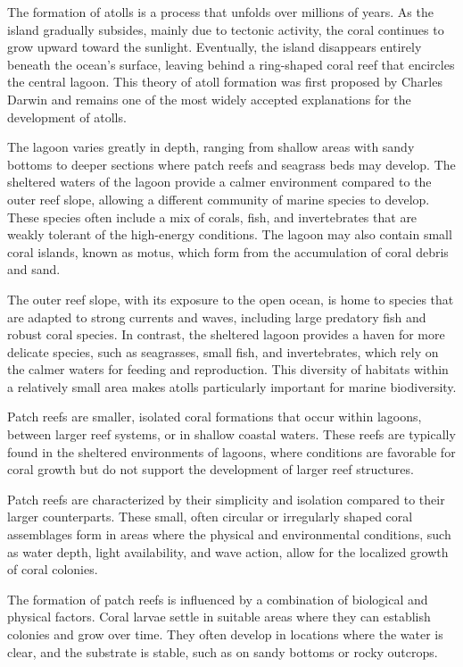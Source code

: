 The formation of atolls is a process that unfolds over millions of years. As the island gradually subsides, mainly due to tectonic activity, the coral continues to grow upward toward the sunlight. Eventually, the island disappears entirely beneath the ocean's surface, leaving behind a ring-shaped coral reef that encircles the central lagoon. This theory of atoll formation was first proposed by Charles Darwin and remains one of the most widely accepted explanations for the development of atolls.

The lagoon varies greatly in depth, ranging from shallow areas with sandy bottoms to deeper sections where patch reefs and seagrass beds may develop. The sheltered waters of the lagoon provide a calmer environment compared to the outer reef slope, allowing a different community of marine species to develop. These species often include a mix of corals, fish, and invertebrates that are weakly tolerant of the high-energy conditions. The lagoon may also contain small coral islands, known as motus, which form from the accumulation of coral debris and sand.

The outer reef slope, with its exposure to the open ocean, is home to species that are adapted to strong currents and waves, including large predatory fish and robust coral species. In contrast, the sheltered lagoon provides a haven for more delicate species, such as seagrasses, small fish, and invertebrates, which rely on the calmer waters for feeding and reproduction. This diversity of habitats within a relatively small area makes atolls particularly important for marine biodiversity.

Patch reefs are smaller, isolated coral formations that occur within lagoons, between larger reef systems, or in shallow coastal waters. These reefs are typically found in the sheltered environments of lagoons, where conditions are favorable for coral growth but do not support the development of larger reef structures.

Patch reefs are characterized by their simplicity and isolation compared to their larger counterparts. These small, often circular or irregularly shaped coral assemblages form in areas where the physical and environmental conditions, such as water depth, light availability, and wave action, allow for the localized growth of coral colonies.

The formation of patch reefs is influenced by a combination of biological and physical factors. Coral larvae settle in suitable areas where they can establish colonies and grow over time. They often develop in locations where the water is clear, and the substrate is stable, such as on sandy bottoms or rocky outcrops.

